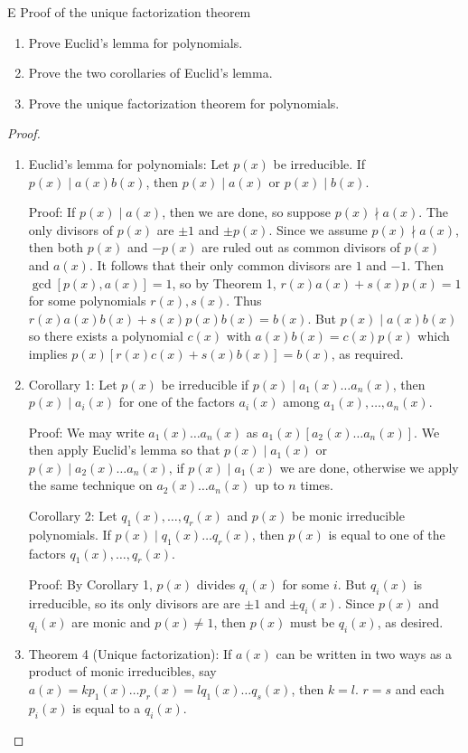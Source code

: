 \begin{exercise}{E Proof of the unique factorization theorem}
\begin{enumerate}
    \item Prove Euclid's lemma for polynomials.
    \item Prove the two corollaries of Euclid's lemma.
    \item Prove the unique factorization theorem for polynomials.
\end{enumerate}
\end{exercise}
\begin{proof}
 \begin{enumerate}
     \item Euclid's lemma for polynomials: Let $p(x)$ be irreducible. If ${p(x)\mid a(x)b(x)}$, then $p(x)\mid a(x)$ or $p(x)\mid b(x)$.

     Proof: If $p(x)\mid a(x)$, then we are done, so suppose $p(x)\nmid a(x)$. The only divisors of $p(x)$ are $\pm 1$ and $\pm p(x)$. Since we assume $p(x)\nmid a(x)$, then both $p(x)$ and $-p(x)$ are ruled out as common divisors of $p(x)$ and $a(x)$. It follows that their only common divisors are $1$ and $-1$. Then $\gcd[p(x),a(x)]=1$, so by Theorem 1, $r(x)a(x)+s(x)p(x)=1$ for some polynomials $r(x), s(x)$. Thus $r(x)a(x)b(x)+s(x)p(x)b(x)=b(x)$. But $p(x)\mid a(x)b(x)$ so there exists a polynomial $c(x)$ with $a(x)b(x)=c(x)p(x)$ which implies $p(x)[r(x)c(x)+s(x)b(x)]=b(x)$, as required.
     \item Corollary 1: Let $p(x)$ be irreducible if $p(x)\mid a_1(x)\dots a_n(x)$, then $p(x)\mid a_i(x)$ for one of the factors $a_i(x)$ among $a_1(x),\dots,a_n(x)$.

     Proof: We may write $a_1(x)\dots a_n(x)$ as $a_1(x)[a_2(x)\dots a_n(x)]$. We then apply Euclid's lemma so that $p(x)\mid a_1(x)$ or $p(x)\mid a_2(x)\dots a_n(x)$, if $p(x)\mid a_1(x)$ we are done, otherwise we apply the same technique on $a_2(x)\dots a_n(x)$ up to $n$ times. 

     Corollary 2: Let $q_1(x),\dots,q_r(x)$ and $p(x)$ be monic irreducible polynomials. If $p(x)\mid q_1(x)\dots q_r(x)$, then $p(x)$ is equal to one of the factors $q_1(x),\dots,q_r(x)$.

     Proof: By Corollary 1, $p(x)$ divides $q_i(x)$ for some $i$. But $q_i(x)$ is irreducible, so its only divisors are are $\pm 1$ and $\pm q_i(x)$. Since $p(x)$ and $q_i(x)$ are monic and $p(x)\neq 1$, then $p(x)$ must be $q_i(x)$, as desired.
     \item Theorem 4 (Unique factorization): If $a(x)$ can be written in two ways as a product of monic irreducibles, say $a(x)=kp_1(x)\dots p_r(x)=lq_1(x)\dots q_s(x)$, then $k=l$. $r=s$ and each $p_i(x)$ is equal to a $q_i(x)$.


\end{enumerate}
\end{proof}
